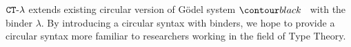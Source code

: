 %

%

${ {\tt CT}\mbox{-}\lambda}$ extends existing circular version of 
G\"{o}del system $\systemT$ with the binder $\lambda$. 
By introducing a circular syntax with binders, 
we hope to provide a circular syntax more familiar to researchers working in the
field of Type Theory. 
\\

